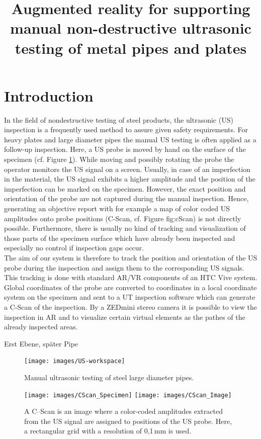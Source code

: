 \documentclass{VRARWorkshop}
\title{Augmented reality for supporting manual non-destructive ultrasonic testing of metal pipes and plates}
\begin{document}
\section{Introduction}

In the field of nondestructive testing of steel products, the ultrasonic (US) inspection is a frequently used method to assure given safety requirements. For heavy plates and large diameter pipes the manual US testing is often applied as a follow-up inspection. Here, a US probe is moved by hand on the surface of the specimen (cf. Figure \ref{fig:manual_UT}). While moving and possibly rotating the probe the operator monitors the US signal on a screen. Usually, in case of an imperfection in the material, the US signal exhibits a higher amplitude and the position of the imperfection can be marked on the specimen.
However, the exact position and orientation of the probe are not captured during the manual inspection. Hence, generating an objective report with for example a map of color coded US amplitudes onto probe positions (C-Scan, cf. Figure fig:cScan) is not directly possible. Furthermore, there is usually no kind of tracking and visualization of those parts of the specimen surface which have already been inspected and especially no control if inspection gaps occur. \\
The aim of our system is therefore to track the position and orientation of the US probe during the inspection and assign them to the corresponding US signals. This tracking is done with standard AR/VR components of an HTC Vive system. Global coordinates of the probe are converted to coordinates in a local coordinate system on the specimen and sent to a UT inspection software which can generate a C-Scan of the inspection. By a ZEDmini stereo camera it is possible to view the inspection in AR and to visualize certain virtual elements as the pathes of the already inspected areas.

Erst Ebene, später Pipe

\begin{figure}[h!]
    \begin{center}
        \texttt{[image: images/US-workspace]}
        \caption{\label{fig:manual_UT} Manual ultrasonic testing of steel large diameter pipes.}
    \end{center}
\end{figure}
\begin{figure}[h!]
    \begin{center}
        \texttt{[image: images/CScan\_Specimen]}
				\hspace{0.5mm}
        \texttt{[image: images/CScan\_Image]}
        \caption{\label{fig:cScan} A C--Scan is an image where a color-coded amplitudes extracted from the US signal 
				are assigned to positions of the US probe. Here, a rectangular grid with a resolution of 0,1\,mm is used.}
    \end{center}
\end{figure}
\end{document}
